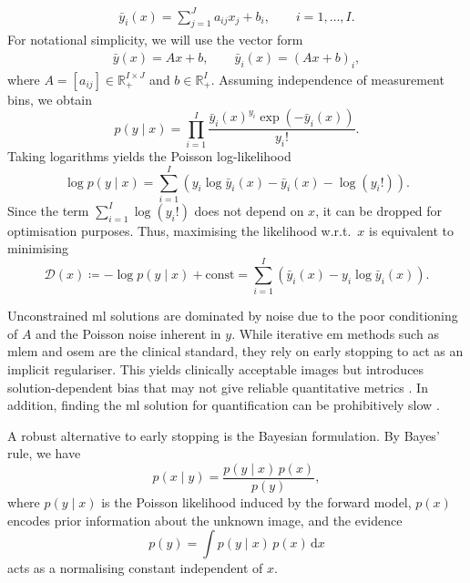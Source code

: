 \begin{align}
\bar y_i(x) = \sum_{j=1}^{J} a_{ij} x_j + b_i, \qquad i=1,\dots,I.
\end{align}
For notational simplicity, we will use the vector form
\begin{align}\label{eq:forward_model}
\bar y(x) = A x + b, \quad \quad \bar y_i(x) = (A x + b)_i,
\end{align}
where $A=[a_{ij}] \in \mathbb R_+^{I\times J}$ and $b\in\mathbb R_+^{I}$. Assuming independence of measurement bins, we obtain
\begin{equation}
p(y\mid x)
= \prod_{i=1}^I \frac{\bar{y}_i(x)^{y_i}\exp\!\left(-\bar{y}_i(x)\right)}{y_i!}.
\end{equation}
Taking logarithms yields the Poisson log-likelihood
\begin{equation}
\log p(y\mid x)
= \sum_{i=1}^I \left( y_i \log \bar{y}_i(x) - \bar{y}_i(x) - \log(y_i!) \right).
\end{equation}
Since the term $\sum_{i=1}^I \log(y_i!)$ does not depend on $x$, it can be dropped for optimisation purposes. Thus, maximising the likelihood w.r.t.~$x$ is equivalent to minimising
\begin{equation}
\mathcal{D}(x)
\coloneqq -\log p(y\mid x) + \mathrm{const}
= \sum_{i=1}^I \left( \bar{y}_i(x) - y_i \log \bar{y}_i(x) \right).
 \end{equation}

Unconstrained \gls{ml} solutions are dominated by noise due to the poor conditioning of $A$ and the Poisson noise inherent in $y$. While iterative \gls{em} methods such as \gls{mlem} and \gls{osem} \cite{dempsterMaximumLikelihoodIncomplete1977, sheppMaximumLikelihoodReconstruction1982} are the clinical standard, they rely on early stopping to act as an implicit regulariser. This yields clinically acceptable images but introduces solution-dependent bias that may not give reliable quantitative metrics \cite{veklerovStoppingRuleMLE1987}. In addition, finding the \gls{ml} solution for quantification can be prohibitively slow \cite{wuConvergencePropertiesEM1983}.

A robust alternative to early stopping is the Bayesian formulation. By Bayes' rule, we have
\begin{equation}
p(x\mid y) = \frac{p(y\mid x)\,p(x)}{p(y)},
\end{equation}
where $p(y\mid x)$ is the Poisson likelihood induced by the forward model, $p(x)$ encodes prior information about the unknown image, and the evidence
\begin{equation}
p(y) = \int p(y\mid x)\,p(x)\,\mathrm{d}x
\end{equation}
acts as a normalising constant independent of $x$.

